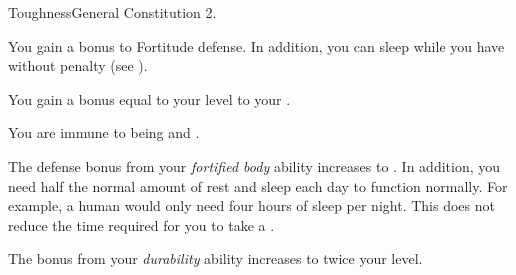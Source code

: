     \begin{feat}{Toughness}{General}
        \featpre Constitution 2.

         You gain a  bonus to Fortitude defense.
        In addition, you can sleep while you have  without penalty (see ).

         You gain a bonus equal to your level to your .

         You are immune to being \dazed and \stunned.

         The defense bonus from your \textit{fortified body} ability increases to .
        In addition, you need half the normal amount of rest and sleep each day to function normally.
        For example, a human would only need four hours of sleep per night.
        This does not reduce the time required for you to take a .

         The bonus from your \textit{durability} ability increases to twice your level.
    \end{feat}

